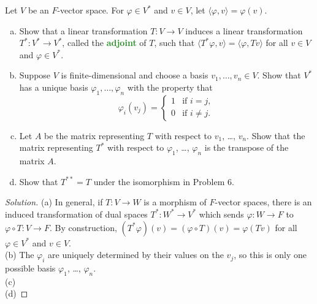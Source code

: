 \documentclass[10pt]{article}
\providecommand{\ii}{\item}
\newenvironment{soln}{\begin{proof}[Solution]}{\end{proof}}
\providecommand{\vocab}[1]{{\textbf{\textcolor{ForestGreen}{#1}}}}
\begin{document}
\begin{problem}
    Let $V$ be an $F$-vector space.
    For $\varphi\in V^*$ and $v\in V$, let $\langle\varphi,v\rangle = \varphi(v)$.
    \begin{enumerate}[(a)]
        \ii Show that a linear transformation $T\colon V\to V$
	induces a linear transformation $T^*\colon V^*\to V^*$,
	called the \vocab{adjoint} of $T$,
	such that $\langle T^*\varphi,v\rangle = \langle \varphi,Tv\rangle$
	for all $v\in V$ and $\varphi\in V^*$.
	\ii Suppose $V$ is finite-dimensional and choose a basis $v_1,\dots,v_n\in V$.
	Show that $V^*$ has a unique basis $\varphi_1,\dots,\varphi_n$
	with the property that
	\begin{equation*}
	    \varphi_i(v_j) = \begin{cases}
		1 & \text{if }i = j,\\
		0 & \text{if }i \ne j.
	    \end{cases}
	\end{equation*}
	\ii Let $A$ be the matrix representing $T$
	with respect to $v_1$, \dots, $v_n$.
	Show that the matrix representing $T^*$
	with respect to $\varphi_1$, \dots, $\varphi_n$
	is the transpose of the matrix $A$.
	\ii Show that $T^{**} = T$ under the isomorphism in Problem 6.
    \end{enumerate}
\end{problem}

\begin{soln}
    (a) In general, if $T\colon V\to W$ is a morphism of $F$-vector spaces,
    there is an induced transformation of dual spaces
    $T^* \colon W^*\to V^*$ which sends
    $\varphi\colon W\to F$ to $\varphi\circ T\colon V\to F$.
    By construction, $(T^*\varphi)(v) = (\varphi\circ T)(v) = \varphi(Tv)$
    for all $\varphi\in V^*$ and $v\in V$.
    \\

    (b) The $\varphi_i$ are uniquely determined by their values on the $v_j$,
    so this is only one possible basis $\varphi_1$, \dots, $\varphi_n$.
    \\

    (c)
    \\

    (d) 
\end{soln}
\end{document}
